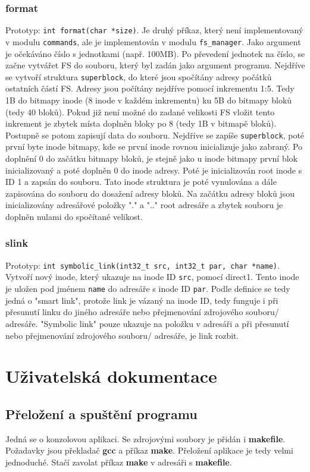 \documentclass[12pt]{report}
\begin{document}
\subsection{format}
Prototyp: \texttt{int format(char *size)}. Je druhý příkaz, který není implementovaný v modulu \texttt{commands},
ale je implementován v modulu \texttt{fs\_manager}. Jako argument je očekáváno číslo s jednotkami (např. 100MB). 
Po převedení jednotek na číslo, se začne vytvářet FS do souboru, který byl zadán jako argument programu. Nejdříve
se vytvoří struktura \texttt{superblock}, do které jsou spočítány adresy počátků ostatních částí FS. Adresy jsou
počítány nejdříve pomocí inkrementu 1:5. Tedy 1B do bitmapy inode (8 inode v každém inkrementu) ku 5B do bitmapy
bloků (tedy 40 bloků). Pokud již není možné do zadané velikosti FS vložit tento inkrement je zbytek místa doplněn bloky
po 8 (tedy 1B v bitmapě bloků). Postupně se potom zapisují data do souboru. Nejdříve se zapíše \texttt{superblock},
poté první byte inode bitmapy, kde se první inode rovnou inicializuje jako zabraný. Po doplnění 0 do začátku bitmapy
bloků, je stejně jako u inode bitmapy první blok inicializovaný a poté doplněn 0 do inode adresy. Poté je inicializován
root inode s ID 1 a zapsán do souboru. Tato inode struktura je poté vynulována a dále zapisována do souboru do dosažení
adresy bloků. Na začátku adresy bloků jsou inicializovány adresářové položky "." a ".." root adresáře a zbytek souboru
je doplněn nulami do spočítané velikost.
\subsection{slink}\label{slink_exp}
Prototyp: \texttt{int symbolic\_link(int32\_t src, int32\_t par, char *name)}. Vytvoří nový inode, který ukazuje
na inode ID \texttt{src}, pomocí direct1. Tento inode je uložen pod jménem \texttt{name} do adresáře s inode ID
\texttt{par}. Podle definice se tedy jedná o "smart link", protože link je vázaný na inode ID, tedy funguje
i při přesunutí linku do jiného adresáře nebo přejmenování zdrojového souboru/ adresáře. "Symbolic link" pouze
ukazuje na položku v adresáři a při přesunutí nebo přejmenování zdrojového souboru/ adresáře, je link rozbit.
%
%
\chapter{Uživatelská dokumentace}
%
\section{Přeložení a spuštění programu}
Jedná se o konzolovou aplikaci. Se zdrojovými soubory je přidán i \textbf{makefile}. Požadavky jsou
překladač \textbf{gcc} a příkaz \textbf{make}. Přeložení aplikace je tedy velmi jednoduché. Stačí 
zavolat příkaz \textbf{make} v adresáři s \textbf{makefile}.
\end{document}

